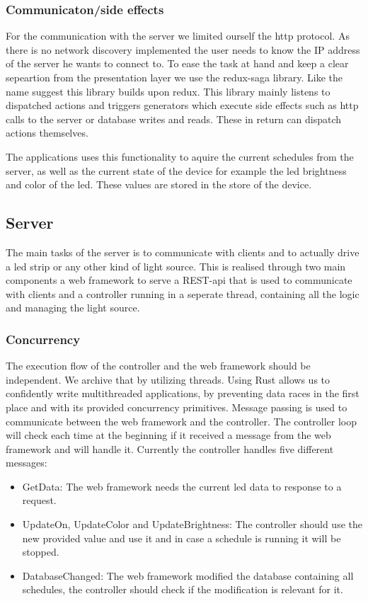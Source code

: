 \documentclass[conference]{IEEEtran}
\begin{document}
\subsubsection{Communicaton/side effects}
For the communication with the server we limited ourself the http protocol. As there is no network discovery implemented the user needs
to know the IP address of the server he wants to connect to. To ease the task at hand and keep a clear sepeartion from the presentation
layer we use the redux-saga library. Like the name suggest this library builds upon redux. This library mainly listens to dispatched
actions and triggers generators which execute side effects such as http calls to the server or database writes and reads. These in
return can dispatch actions themselves.

The applications uses this functionality to aquire the current schedules from the server, as well as the current state of the device
for example the led brightness and color of the led. These values are stored in the store of the device.

\subsection{Server}
The main tasks of the server is to communicate with clients and to actually drive a led strip or any other kind of light source.
This is realised through two main components a web framework to serve a REST-api that is used to communicate with clients and a
controller running in a seperate thread, containing all the logic and managing the light source.

\subsubsection{Concurrency}
The execution flow of the controller and the web framework should be independent. We archive that by utilizing threads. Using Rust 
allows us to confidently write multithreaded applications\cite{rust:con}, by preventing data races in the first place and with its
provided concurrency primitives. Message passing is used to communicate between the web framework and the controller. The controller
loop will check each time at the beginning if it received a message from the web framework and will handle it. Currently the
controller handles five different messages:

\begin{itemize}
    \item GetData:
    The web framework needs the current led data to response to a request.
    \item UpdateOn, UpdateColor and UpdateBrightness:
    The controller should use the new provided value and use it and in case a schedule is running it will be stopped.
    \item DatabaseChanged:
    The web framework modified the database containing all schedules, the controller should check if the modification is relevant
    for it.
\end{itemize}
\end{document}
